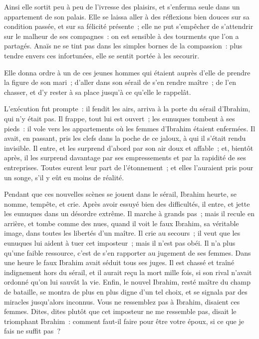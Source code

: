 \documentclass[french,twoside]{book} %
\begin{document}
Ainsi elle sortit peu à peu de l’ivresse des plaisirs, et s’enferma seule dans un appartement de son palais. Elle se laissa aller à des réflexions bien douces sur sa condition passée, et sur sa félicité présente ; elle ne put s’empêcher de s’attendrir sur le malheur de ses compagnes : on est sensible à des tourments que l’on a partagés. Anaïs ne se tint pas dans les simples bornes de la compassion : plus tendre envers ces infortunées, elle se sentit portée à les secourir.\par
Elle donna ordre à un de ces jeunes hommes qui étaient auprès d’elle de prendre la figure de son mari ; d’aller dans son sérail de s’en rendre maître ; de l’en chasser, et d’y rester à sa place jusqu’à ce qu’elle le rappelât.\par
L’exécution fut prompte : il fendit les airs, arriva à la porte du sérail d’Ibrahim, qui n’y était pas. Il frappe, tout lui est ouvert ; les eunuques tombent à ses pieds : il vole vers les appartements où les femmes d’Ibrahim étaient enfermées. Il avait, en passant, pris les clefs dans la poche de ce jaloux, à qui il s’était rendu invisible. Il entre, et les surprend d’abord par son air doux et affable ; et, bientôt après, il les surprend davantage par ses empressements et par la rapidité de ses entreprises. Toutes eurent leur part de l’étonnement ; et elles l’auraient pris pour un songe, s’il y eût eu moins de réalité.\par
Pendant que ces nouvelles scènes se jouent dans le sérail, Ibrahim heurte, se nomme, tempête, et crie. Après avoir essuyé bien des difficultés, il entre, et jette les eunuques dans un désordre extrême. Il marche à grands pas ; mais il recule en arrière, et tombe comme des nues, quand il voit le faux Ibrahim, sa véritable image, dans toutes les libertés d’un maître. Il crie au secours ; il veut que les eunuques lui aident à tuer cet imposteur ; mais il n’est pas obéi. Il n’a plus qu’une faible ressource, c’est de s’en rapporter au jugement de ses femmes. Dans une heure le faux Ibrahim avait séduit tous ses juges. Il est chassé et traîné indignement hors du sérail, et il aurait reçu la mort mille fois, si son rival n’avait ordonné qu’on lui sauvât la vie. Enfin, le nouvel Ibrahim, resté maître du champ de bataille, se montra de plus en plus digne d’un tel choix, et se signala par des miracles jusqu’alors inconnus. Vous ne ressemblez pas à Ibrahim, disaient ces femmes. Dites, dites plutôt que cet imposteur ne me ressemble pas, disait le triomphant Ibrahim : comment faut-il faire pour être votre époux, si ce que je fais ne suffit pas ?\par
\end{document}
